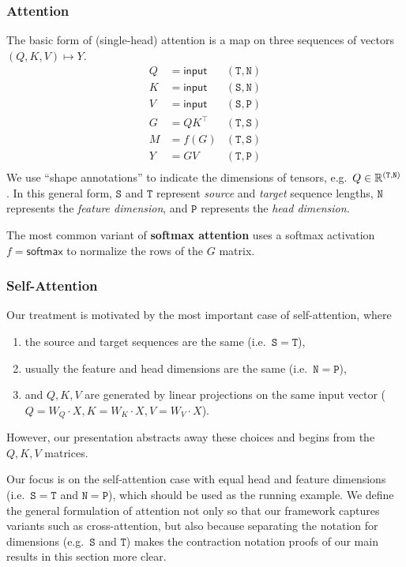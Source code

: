 \subsubsection{Attention}
The basic form of (single-head) attention is a map on three sequences of vectors $(Q, K, V) \mapsto Y$.
\begin{equation}
  \label{eq:kernel-attention}
  \begin{aligned}%
    Q &= \mathsf{input} & \mathtt{(T,N)} \\
    K &= \mathsf{input} & \mathtt{(S,N)} \\
    V &= \mathsf{input} & \mathtt{(S,P)} \\
    G &= QK^\top        & \mathtt{(T,S)} \\
    M &= f(G)           & \mathtt{(T,S)} \\
    Y &= GV             & \mathtt{(T,P)} \\
  \end{aligned}
\end{equation}
We use ``shape annotations'' to indicate the dimensions of tensors, e.g.\ $Q \in \mathbb{R}^{\mathtt{(T,N)}}$.
In this general form, $\mathtt{S}$ and $\mathtt{T}$ represent \emph{source} and \emph{target} sequence lengths,
$\mathtt{N}$ represents the \emph{feature dimension}, and $\mathtt{P}$ represents the \emph{head dimension}.

The most common variant of \textbf{softmax attention} uses a softmax activation $f=\mathsf{softmax}$ to normalize the rows of the $G$ matrix.

\subsubsection{Self-Attention}
Our treatment is motivated by the most important case of self-attention, where
\begin{enumerate}[label=(\roman*)]
  \item the source and target sequences are the same (i.e.\ $\mathtt{S}=\mathtt{T}$),
  \item usually the feature and head dimensions are the same (i.e.\ $\mathtt{N}=\mathtt{P}$),
  \item and $Q, K, V$ are generated by linear projections on the same input vector ($Q = W_Q \cdot X, K = W_K \cdot X, V = W_V \cdot X$).
\end{enumerate}
However, our presentation abstracts away these choices and begins from the $Q, K, V$ matrices.

\begin{remark}
  Our focus is on the self-attention case with equal head and feature dimensions (i.e.\ $\mathtt{S}=\mathtt{T}$ and $\mathtt{N}=\mathtt{P}$),
  which should be used as the running example.
  We define the general formulation of attention not only so that our framework captures variants such as cross-attention,
  but also because separating the notation for dimensions (e.g.\ $\mathtt{S}$ and $\mathtt{T}$) makes the contraction notation proofs
  of our main results in this section more clear.
\end{remark}

